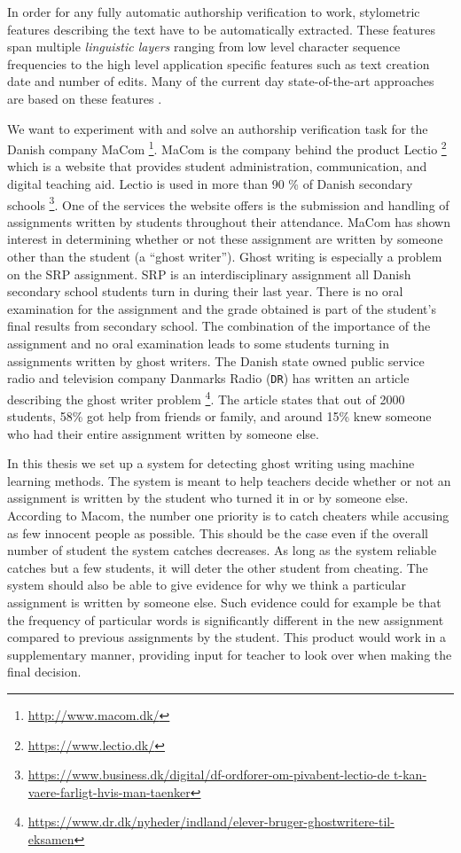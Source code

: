 In order for any fully automatic authorship verification to work, stylometric
features describing the text have to be automatically extracted. These features
span multiple \textit{linguistic layers} ranging from low level character
sequence frequencies to the high level application specific features such as
text creation date and number of edits. Many of the current day state-of-the-art
approaches are based on these features \citep{stamatos2009}.


We want to experiment with and solve an authorship verification task for the
Danish company MaCom \footnote{\url{http://www.macom.dk/}}. MaCom is the company
behind the product Lectio \footnote{\url{https://www.lectio.dk/}} which is
a website that provides student administration, communication, and digital
teaching aid. Lectio is used in more than 90 \% of Danish secondary schools
\footnote{\url{https://www.business.dk/digital/df-ordforer-om-pivabent-lectio-de
t-kan-vaere-farligt-hvis-man-taenker}}. One of the services the website offers
is the submission and handling of assignments written by students throughout
their attendance. MaCom has shown interest in determining whether or not these
assignment are written by someone other than the student (a ``ghost writer'').
Ghost writing is especially a problem on the \gls{SRP} assignment. \gls{SRP} is
an interdisciplinary assignment all Danish secondary school students turn in
during their last year. There is no oral examination for the assignment and the
grade obtained is part of the student's final results from secondary school.
The combination of the importance of the assignment and no oral examination
leads to some students turning in assignments written by ghost writers. The
Danish state owned public service radio and television company Danmarks Radio
(\texttt{DR}) has written an article describing the ghost writer problem
\footnote{\url{https://www.dr.dk/nyheder/indland/elever-bruger-ghostwritere-til-
eksamen}}. The article states that out of 2000 students, 58\% got help from
friends or family, and around 15\% knew someone who had their entire assignment
written by someone else.


In this thesis we set up a system for detecting ghost writing using machine
learning methods. The system is meant to help teachers decide whether or not
an assignment is written by the student who turned it in or by someone else.
According to Macom, the number one priority is to catch cheaters while accusing
as few innocent people as possible. This should be the case even if the overall
number of student the system catches decreases. As long as the system reliable
catches but a few students, it will deter the other student from cheating.
The system should also be able to give evidence for why we think a particular
assignment is written by someone else. Such evidence could for example be
that the frequency of particular words is significantly different in the new
assignment compared to previous assignments by the student. This product would
work in a supplementary manner, providing input for teacher to look over when
making the final decision.


